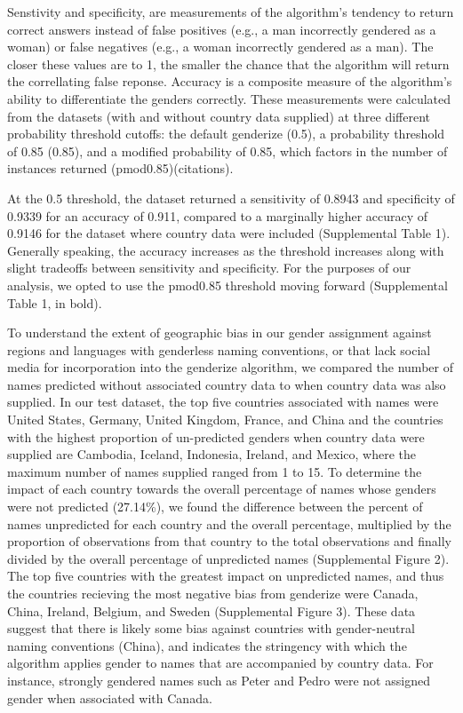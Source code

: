 \documentclass[11pt,]{article}
\begin{document}
Senstivity and specificity, are measurements of the algorithm's tendency
to return correct answers instead of false positives (e.g., a man
incorrectly gendered as a woman) or false negatives (e.g., a woman
incorrectly gendered as a man). The closer these values are to 1, the
smaller the chance that the algorithm will return the correllating false
reponse. Accuracy is a composite measure of the algorithm's ability to
differentiate the genders correctly. These measurements were calculated
from the datasets (with and without country data supplied) at three
different probability threshold cutoffs: the default genderize (0.5), a
probability threshold of 0.85 (0.85), and a modified probability of
0.85, which factors in the number of instances returned
(pmod0.85)(citations).

At the 0.5 threshold, the dataset returned a sensitivity of 0.8943 and
specificity of 0.9339 for an accuracy of 0.911, compared to a marginally
higher accuracy of 0.9146 for the dataset where country data were
included (Supplemental Table 1). Generally speaking, the accuracy
increases as the threshold increases along with slight tradeoffs between
sensitivity and specificity. For the purposes of our analysis, we opted
to use the pmod0.85 threshold moving forward (Supplemental Table 1, in
bold).

To understand the extent of geographic bias in our gender assignment
against regions and languages with genderless naming conventions, or
that lack social media for incorporation into the genderize algorithm,
we compared the number of names predicted without associated country
data to when country data was also supplied. In our test dataset, the
top five countries associated with names were United States, Germany,
United Kingdom, France, and China and the countries with the highest
proportion of un-predicted genders when country data were supplied are
Cambodia, Iceland, Indonesia, Ireland, and Mexico, where the maximum
number of names supplied ranged from 1 to 15. To determine the impact of
each country towards the overall percentage of names whose genders were
not predicted (27.14\%), we found the difference between the percent of
names unpredicted for each country and the overall percentage,
multiplied by the proportion of observations from that country to the
total observations and finally divided by the overall percentage of
unpredicted names (Supplemental Figure 2). The top five countries with
the greatest impact on unpredicted names, and thus the countries
recieving the most negative bias from genderize were Canada, China,
Ireland, Belgium, and Sweden (Supplemental Figure 3). These data suggest
that there is likely some bias against countries with gender-neutral
naming conventions (China), and indicates the stringency with which the
algorithm applies gender to names that are accompanied by country data.
For instance, strongly gendered names such as Peter and Pedro were not
assigned gender when associated with Canada.
\end{document}
